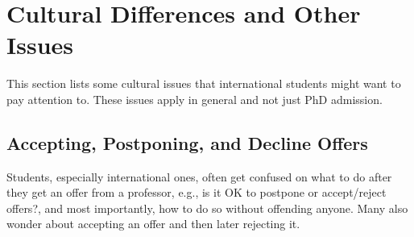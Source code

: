 \documentclass[oneside,11pt]{book}
\begin{document}


\chapter{Cultural Differences and Other Issues}\label{sec:cultural}

This section lists some cultural issues that international students might want to pay attention to. These issues apply in general and not just PhD admission.


\section{Accepting, Postponing, and Decline Offers}\label{sec:accept-postpone-decline}

Students, especially international ones, often get confused on what to do after they get an offer from a professor, e.g., is it OK to postpone or accept/reject offers?, and most importantly, how to do so without offending anyone. Many also wonder about accepting an offer and then later rejecting it.
\end{document}

